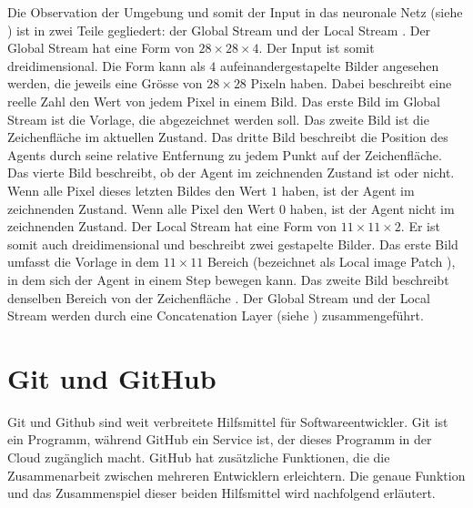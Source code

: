 Die Observation der Umgebung und somit der Input in das neuronale Netz (siehe
) ist in zwei Teile gegliedert: der Global Stream und
der Local Stream \cite[S. 4]{zhou_learning_2018}. Der Global Stream hat eine
Form von $28\times28\times4$. Der Input ist somit dreidimensional. Die Form kann
als $4$ aufeinandergestapelte Bilder angesehen werden, die jeweils eine Grösse
von $28\times28$ Pixeln haben. Dabei beschreibt eine reelle Zahl den Wert von
jedem Pixel in einem Bild. Das erste Bild im Global Stream ist die Vorlage, die
abgezeichnet werden soll. Das zweite Bild ist die Zeichenfläche im aktuellen
Zustand. Das dritte Bild beschreibt die Position des Agents durch seine relative
Entfernung zu jedem Punkt auf der Zeichenfläche. Das vierte Bild beschreibt, ob
der Agent im zeichnenden Zustand ist oder nicht. Wenn alle Pixel dieses letzten
Bildes den Wert $1$ haben, ist der Agent im zeichnenden Zustand. Wenn alle Pixel
den Wert $0$ haben, ist der Agent nicht im zeichnenden Zustand. Der Local Stream
hat eine Form von $11\times11\times2$. Er ist somit auch dreidimensional und
beschreibt zwei gestapelte Bilder. Das erste Bild umfasst die Vorlage in dem
$11\times11$ Bereich (bezeichnet als Local image Patch \cite[S.
5]{zhou_learning_2018}), in dem sich der Agent in einem Step bewegen kann. Das
zweite Bild beschreibt denselben Bereich von der Zeichenfläche \cite[S. 4
ff.]{zhou_learning_2018}. Der Global Stream und der Local Stream werden durch
eine Concatenation Layer (siehe ) zusammengeführt.
 
\section{Git und GitHub}\label{chap:t_git} Git und Github sind weit verbreitete
Hilfsmittel für Softwareentwickler. Git ist ein Programm, während GitHub ein
Service ist, der dieses Programm in der Cloud zugänglich macht. GitHub hat
zusätzliche Funktionen, die die Zusammenarbeit zwischen mehreren Entwicklern
erleichtern. Die genaue Funktion und das Zusammenspiel dieser beiden Hilfsmittel
wird nachfolgend erläutert.
 
